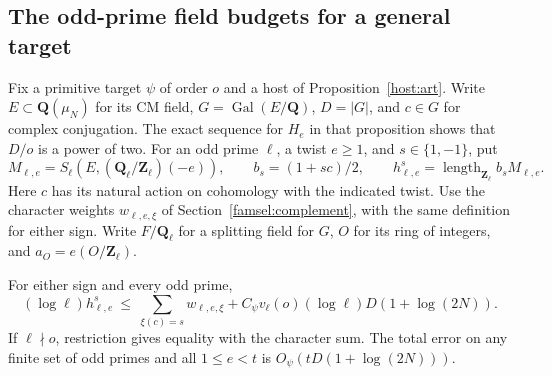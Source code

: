 \subsection{The odd-prime field budgets for a general target}\label{addo:field}

Fix a primitive target \(\psi\) of order \(o\) and a host of
Proposition~\ref{host:art}. Write \(E\subset\mathbf Q(\mu_N)\) for
its CM field, \(G=\operatorname{Gal}(E/\mathbf Q)\), \(D=|G|\), and
\(c\in G\) for complex conjugation. The exact sequence for \(H_e\) in
that proposition shows that \(D/o\) is a power of two. For an odd
prime \(\ell\), a twist \(e\ge1\), and \(s\in\{1,-1\}\), put
\[
 M_{\ell,e}=S_\ell(E,(\mathbf Q_\ell/\mathbf Z_\ell)(-e)),\qquad
 b_s=(1+sc)/2,\qquad
 h_{\ell,e}^s=\operatorname{length}_{\mathbf Z_\ell} b_s M_{\ell,e}.
\]
Here \(c\) has its natural action on cohomology with the indicated
twist. Use the character weights \(w_{\ell,e,\xi}\) of
Section~\ref{famsel:complement}, with the same definition for either
sign. Write \(F/\mathbf Q_\ell\) for a splitting field for \(G\),
\(O\) for its ring of integers, and \(a_O=e(O/\mathbf Z_\ell)\).

\begin{proposition}\label{addo:compare}
For either sign and every odd prime,
\[
 (\log\ell)h_{\ell,e}^s
 \ \le\ \sum_{\xi(c)=s} w_{\ell,e,\xi}
       + C_\psi v_\ell(o)(\log\ell)D(1+\log(2N)).
\]
If \(\ell\nmid o\), restriction gives equality with the character sum.
The total error on any finite set of odd primes and all \(1\le e<t\)
is \(O_\psi(tD(1+\log(2N)))\).
\end{proposition}

